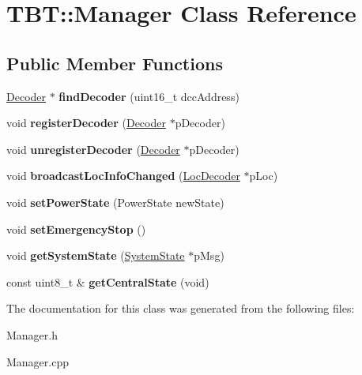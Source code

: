\hypertarget{classTBT_1_1Manager}{}\section{T\+BT\+:\+:Manager Class Reference}
\label{classTBT_1_1Manager}
\subsection*{Public Member Functions}
\begin{DoxyCompactItemize}
\item 
\mbox{\label{classTBT_1_1Manager_a04d5ae5069f1f17ee682f4ae68141687}} 
\hyperlink{classTBT_1_1Decoder}{Decoder} $\ast$ {\bfseries find\+Decoder} (uint16\+\_\+t dcc\+Address)
\item 
\mbox{\label{classTBT_1_1Manager_a7b20f8a47d78cfd39649722a9fba2f7c}} 
void {\bfseries register\+Decoder} (\hyperlink{classTBT_1_1Decoder}{Decoder} $\ast$p\+Decoder)
\item 
\mbox{\label{classTBT_1_1Manager_a507ac74f4adfbb6173728bebe71e40e6}} 
void {\bfseries unregister\+Decoder} (\hyperlink{classTBT_1_1Decoder}{Decoder} $\ast$p\+Decoder)
\item 
\mbox{\label{classTBT_1_1Manager_aaac6dc1a57d9c578a3da2243584a8a22}} 
void {\bfseries broadcast\+Loc\+Info\+Changed} (\hyperlink{classTBT_1_1LocDecoder}{Loc\+Decoder} $\ast$p\+Loc)
\item 
\mbox{\label{classTBT_1_1Manager_a6e7616a839a1b48d89355bc740ed7793}} 
void {\bfseries set\+Power\+State} (Power\+State new\+State)
\item 
\mbox{\label{classTBT_1_1Manager_a5f5fdba7ccae731f3f348b572fd0ed16}} 
void {\bfseries set\+Emergency\+Stop} ()
\item 
\mbox{\label{classTBT_1_1Manager_a007018b4e6441c9af63cb72f1ffc8a19}} 
void {\bfseries get\+System\+State} (\hyperlink{structTBT_1_1SystemState}{System\+State} $\ast$p\+Msg)
\item 
\mbox{\label{classTBT_1_1Manager_a78e5bea49f6662b5f44c1c0aafe4cb75}} 
const uint8\+\_\+t \& {\bfseries get\+Central\+State} (void)
\end{DoxyCompactItemize}


The documentation for this class was generated from the following files\+:\begin{DoxyCompactItemize}
\item 
Manager.\+h\item 
Manager.\+cpp\end{DoxyCompactItemize}
